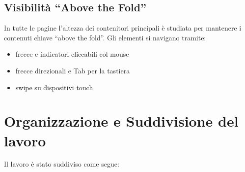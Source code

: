 \documentclass{article}
\begin{document}
\subsection{Visibilità “Above the Fold”}
In tutte le pagine l’altezza dei contenitori principali è studiata per mantenere i contenuti chiave “above the fold”. Gli elementi si navigano tramite:
\begin{itemize}
  \item frecce e indicatori cliccabili col mouse  
  \item frecce direzionali e Tab per la tastiera  
  \item swipe su dispositivi touch  
\end{itemize}


\newpage

\section{Organizzazione e Suddivisione del lavoro}
Il lavoro è stato suddiviso come segue:
\end{document}
